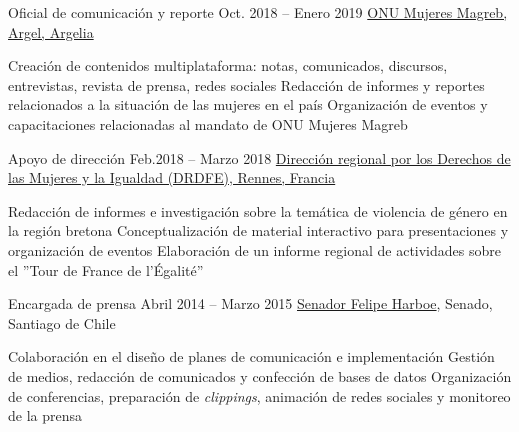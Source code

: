 \begin{joblist}

\item[Oficial de comunicación y reporte]{Oct. 2018 -- Enero 2019 }
    {
    \href{http://maghreb.unwomen.org/fr}{ONU Mujeres Magreb, Argel, Argelia}
    }
    {
        \vspace{-0.5cm}
        \begin{itemize}
            \iftbftiny \setlength\itemsep{-3pt} \fi
            \cvitem[\checkmark] Creación de contenidos multiplataforma: notas, comunicados, discursos, entrevistas, revista de prensa, redes sociales
            \cvitem[\checkmark] Redacción de informes y reportes relacionados a la situación de las mujeres en el país
            \cvitem[\checkmark] Organización de eventos y capacitaciones relacionadas al mandato de ONU Mujeres Magreb
        \end{itemize}
    }


\item[Apoyo de dirección]{Feb.2018 -- Marzo 2018 }
    {
    \href{https://www.egalite-femmes-hommes.gouv.fr/le-secretariat-d-etat/organisation-du-ministere/services-territoriaux/annuaire-des-equipes-regionales-et-departementales/}{Dirección regional por los Derechos de las Mujeres y la Igualdad (DRDFE), Rennes, Francia}
    }
    {
        \iftbftiny \vspace{-0.5cm} \fi
        \begin{itemize}
            \iftbftiny \setlength\itemsep{-3pt} \fi
            \cvitem[\checkmark] Redacción de informes e investigación sobre la temática de violencia de género en la región bretona
            \cvitem[\checkmark] Conceptualización de material interactivo para presentaciones y organización de eventos
            \cvitem[\checkmark] Elaboración de un informe regional de actividades sobre el ''Tour de France de l'Égalité''
        \end{itemize}
    }



\item[Encargada de prensa ]{Abril 2014 -- Marzo 2015}
    {
    \href{https://www.harboe.cl/}{Senador Felipe Harboe}, Senado, Santiago de Chile
    }
    {
        \iftbftiny \vspace{-0.5cm} \fi
        \begin{itemize}
            \iftbftiny \setlength\itemsep{-3pt} \fi
            \cvitem[\checkmark] Colaboración en el diseño de planes de comunicación e implementación
            \cvitem[\checkmark] Gestión de medios, redacción de comunicados y confección de bases de datos
            \cvitem[\checkmark] Organización de conferencias, preparación de \textit{clippings}, animación de redes sociales y monitoreo de la prensa
        \end{itemize}
    }




\end{joblist}
